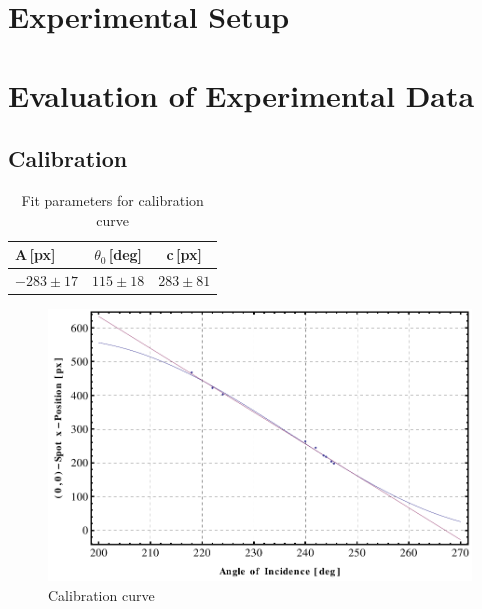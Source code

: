 \documentclass[a4paper,10pt]{scrartcl}
\begin{document}
\section{Experimental Setup}

\section{Evaluation of Experimental Data}

\subsection{Calibration}

\begin{table}
\begin{center}
\begin{tabular}{lcc}
\toprule
A\,[px] & $\theta_{0}$\,[deg] & c\,[px] \\
\midrule
$-283 \pm 17$ & $115 \pm 18$  & $283 \pm 81$ \\
\bottomrule
\end{tabular}
\end{center}
\par
\caption{Fit parameters for calibration curve \label{tab:calibdata}}
\end{table}

\begin{figure}
\centering
\includegraphics[scale=0.65]{img/calib}
\caption{Calibration curve \label{fig:calib}}
\end{figure}
\end{document}
